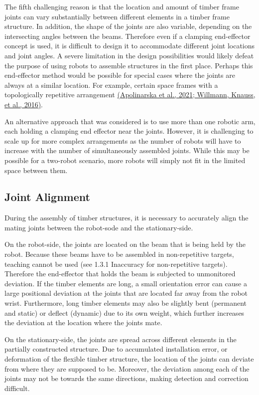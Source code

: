 \documentclass[11pt]{book}
\begin{document}
The fifth challenging reason is that the location and amount of timber frame joints can vary substantially between different elements in a timber frame structure. In addition, the shape of the joints are also variable, depending on the intersecting angles between the beams. Therefore even if a clamping end-effector concept is used, it is difficult to design it to accommodate different joint locations and joint angles. A severe limitation in the design possibilities would likely defeat the purpose of using robots to assemble structures in the first place. Perhaps this end-effector method would be possible for special cases where the joints are always at a similar location. For example, certain space frames with a topologically repetitive arrangement \href{https://www.zotero.org/google-docs/?UUeya7}{(Apolinarska et al., 2021; Willmann, Knauss, et al., 2016)}. 

An alternative approach that was considered is to use more than one robotic arm, each holding a clamping end effector near the joints. However, it is challenging to scale up for more complex arrangements as the number of robots will have to increase with the number of simultaneously assembled joints. While this may be possible for a two-robot scenario, more robots will simply not fit in the limited space between them.

\subsection{Joint Alignment}

During the assembly of timber structures, it is necessary to accurately align the mating joints between the robot-sode and the stationary-side.

On the robot-side, the joints are located on the beam that is being held by the robot. Because these beams have to be assembled in non-repetitive targets, teaching cannot be used (see 1.3.1 Inaccuracy for non-repetitive targets). Therefore the end-effector that holds the beam is subjected to unmonitored deviation. If the timber elements are long, a small orientation error can cause a large positional deviation at the joints that are located far away from the robot wrist. Furthermore, long timber elements may also be slightly bent (permanent and static) or deflect (dynamic) due to its own weight, which further increases the deviation at the location where the joints mate.

On the stationary-side, the joints are spread across different elements in the partially constructed structure. Due to accumulated installation error, or deformation of the flexible timber structure, the location of the joints can deviate from where they are supposed to be. Moreover, the deviation among each of the joints may not be towards the same directions, making detection and correction difficult.
\end{document}
